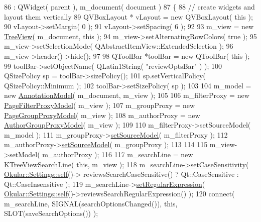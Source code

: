 \begin{DoxyCode}
86     : QWidget( parent ), m\_document( document )
87 \{
88     \textcolor{comment}{// create widgets and layout them vertically}
89     QVBoxLayout * vLayout = \textcolor{keyword}{new} QVBoxLayout( \textcolor{keyword}{this} );
90     vLayout->setMargin( 0 );
91     vLayout->setSpacing( 6 );
92 
93     m\_view = \textcolor{keyword}{new} \hyperlink{classTreeView}{TreeView}( m\_document, \textcolor{keyword}{this} );
94     m\_view->setAlternatingRowColors( \textcolor{keyword}{true} );
95     m\_view->setSelectionMode( QAbstractItemView::ExtendedSelection );
96     m\_view->header()->hide();
97 
98     QToolBar *toolBar = \textcolor{keyword}{new} QToolBar( \textcolor{keyword}{this} );
99     toolBar->setObjectName( QLatin1String( \textcolor{stringliteral}{"reviewOptsBar"} ) );
100     QSizePolicy sp = toolBar->sizePolicy();
101     sp.setVerticalPolicy( QSizePolicy::Minimum );
102     toolBar->setSizePolicy( sp );
103 
104     m\_model = \textcolor{keyword}{new} \hyperlink{classAnnotationModel}{AnnotationModel}( m\_document, m\_view );
105 
106     m\_filterProxy = \textcolor{keyword}{new} \hyperlink{classPageFilterProxyModel}{PageFilterProxyModel}( m\_view );
107     m\_groupProxy = \textcolor{keyword}{new} \hyperlink{classPageGroupProxyModel}{PageGroupProxyModel}( m\_view );
108     m\_authorProxy  = \textcolor{keyword}{new} \hyperlink{classAuthorGroupProxyModel}{AuthorGroupProxyModel}( m\_view );
109 
110     m\_filterProxy->setSourceModel( m\_model );
111     m\_groupProxy->\hyperlink{classPageGroupProxyModel_a74886d438455adbaf72c0face4baf655}{setSourceModel}( m\_filterProxy );
112     m\_authorProxy->\hyperlink{classAuthorGroupProxyModel_a674a68de70e314b094db30b46b28e6bd}{setSourceModel}( m\_groupProxy );
113 
114 
115     m\_view->setModel( m\_authorProxy );
116 
117     m\_searchLine = \textcolor{keyword}{new} \hyperlink{classKTreeViewSearchLine}{KTreeViewSearchLine}( \textcolor{keyword}{this}, m\_view );
118     m\_searchLine->\hyperlink{classKTreeViewSearchLine_a8eda8a70474ddee7918c32a0f60ce3c7}{setCaseSensitivity}( \hyperlink{classOkular_1_1Settings_ae6f72bd2023f2f684f59bca5dde6617c}{Okular::Settings::self}()->
      reviewsSearchCaseSensitive() ? Qt::CaseSensitive : Qt::CaseInsensitive );
119     m\_searchLine->\hyperlink{classKTreeViewSearchLine_ad1bd6c121df94564fea08af73c39b88b}{setRegularExpression}( 
      \hyperlink{classOkular_1_1Settings_ae6f72bd2023f2f684f59bca5dde6617c}{Okular::Settings::self}()->reviewsSearchRegularExpression() );
120     connect( m\_searchLine, SIGNAL(searchOptionsChanged()), \textcolor{keyword}{this}, SLOT(saveSearchOptions()) );

\end{DoxyCode}
